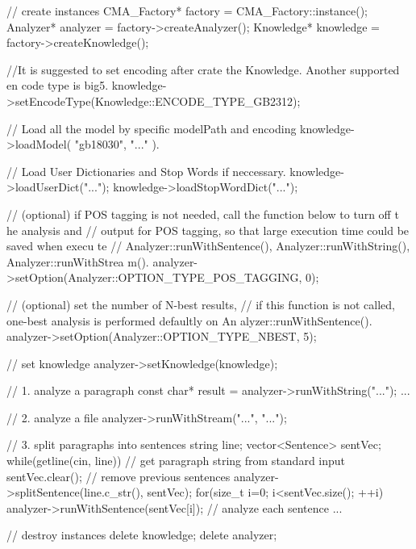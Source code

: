 \begin{DoxyCode}
// create instances
CMA_Factory* factory = CMA_Factory::instance();
Analyzer* analyzer = factory->createAnalyzer();
Knowledge* knowledge = factory->createKnowledge();

//It is suggested to set encoding after crate the Knowledge. Another supported en
      code type is big5.
knowledge->setEncodeType(Knowledge::ENCODE_TYPE_GB2312);

// Load all the model by specific modelPath and encoding
knowledge->loadModel( "gb18030", "..." ).

// Load User Dictionaries and Stop Words if neccessary.
knowledge->loadUserDict("...");
knowledge->loadStopWordDict("...");
 
// (optional) if POS tagging is not needed, call the function below to turn off t
      he analysis and 
// output for POS tagging, so that large execution time could be saved when execu
      te 
// Analyzer::runWithSentence(), Analyzer::runWithString(), Analyzer::runWithStrea
      m().
analyzer->setOption(Analyzer::OPTION_TYPE_POS_TAGGING, 0);

// (optional) set the number of N-best results,
// if this function is not called, one-best analysis is performed defaultly on An
      alyzer::runWithSentence().
analyzer->setOption(Analyzer::OPTION_TYPE_NBEST, 5);

// set knowledge
analyzer->setKnowledge(knowledge);

// 1. analyze a paragraph
const char* result = analyzer->runWithString("...");
...

// 2. analyze a file
analyzer->runWithStream("...", "...");

// 3. split paragraphs into sentences
string line;
vector<Sentence> sentVec;
while(getline(cin, line)) // get paragraph string from standard input
{
    sentVec.clear(); // remove previous sentences
    analyzer->splitSentence(line.c_str(), sentVec);
    for(size_t i=0; i<sentVec.size(); ++i)
    {
        analyzer->runWithSentence(sentVec[i]); // analyze each sentence
        ...
    }
}

// destroy instances
delete knowledge;
delete analyzer;
\end{DoxyCode}
 